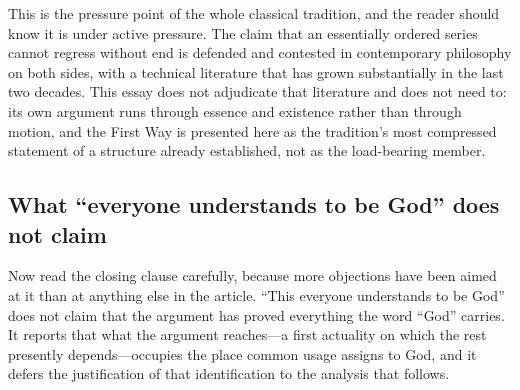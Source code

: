 This is the pressure point of the whole classical tradition, and the reader should know it is under active pressure. The claim that an essentially ordered series cannot regress without end is defended and contested in contemporary philosophy on both sides, with a technical literature that has grown substantially in the last two decades. This essay does not adjudicate that literature and does not need to: its own argument runs through essence and existence rather than through motion, and the First Way is presented here as the tradition's most compressed statement of a structure already established, not as the load-bearing member.

\subsection{What ``everyone understands to be God'' does not claim}

Now read the closing clause carefully, because more objections have been aimed at it than at anything else in the article. ``This everyone understands to be God'' does not claim that the argument has proved everything the word ``God'' carries. It reports that what the argument reaches---a first actuality on which the rest presently depends---occupies the place common usage assigns to God, and it defers the justification of that identification to the analysis that follows.

